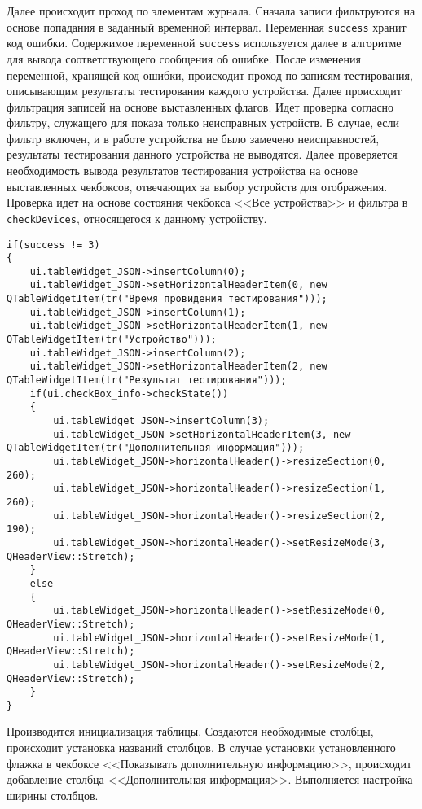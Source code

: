 Далее происходит проход по элементам журнала. Сначала записи фильтруются на основе попадания в заданный временной
интервал.
Переменная \texttt{success} хранит код ошибки. Содержимое переменной \texttt{success} используется далее в алгоритме для
вывода соответствующего сообщения об ошибке.
После изменения переменной, хранящей код ошибки, происходит проход по записям тестирования, описывающим результаты тестирования каждого устройства.
Далее происходит фильтрация записей на основе выставленных флагов. Идет проверка согласно фильтру, служащего для показа только
неисправных устройств. В случае, если фильтр включен, и в работе устройства не было замечено неисправностей, результаты
тестирования данного устройства не выводятся. Далее проверяется необходимость вывода результатов тестирования устройства
на основе выставленных чекбоксов, отвечающих за выбор устройств для отображения. Проверка идет на основе состояния
чекбокса <<Все устройства>> и фильтра в \texttt{checkDevices}, относящегося к данному устройству.
\medskip
\begin{verbatim}
if(success != 3)
{
	ui.tableWidget_JSON->insertColumn(0);
	ui.tableWidget_JSON->setHorizontalHeaderItem(0, new QTableWidgetItem(tr("Время провидения тестирования")));
	ui.tableWidget_JSON->insertColumn(1);
	ui.tableWidget_JSON->setHorizontalHeaderItem(1, new QTableWidgetItem(tr("Устройство")));
	ui.tableWidget_JSON->insertColumn(2);
	ui.tableWidget_JSON->setHorizontalHeaderItem(2, new QTableWidgetItem(tr("Результат тестирования")));
	if(ui.checkBox_info->checkState())
	{
		ui.tableWidget_JSON->insertColumn(3);
		ui.tableWidget_JSON->setHorizontalHeaderItem(3, new QTableWidgetItem(tr("Дополнительная информация")));
		ui.tableWidget_JSON->horizontalHeader()->resizeSection(0, 260);
		ui.tableWidget_JSON->horizontalHeader()->resizeSection(1, 260);
		ui.tableWidget_JSON->horizontalHeader()->resizeSection(2, 190);
		ui.tableWidget_JSON->horizontalHeader()->setResizeMode(3, QHeaderView::Stretch);
	}
	else
	{
		ui.tableWidget_JSON->horizontalHeader()->setResizeMode(0, QHeaderView::Stretch);
		ui.tableWidget_JSON->horizontalHeader()->setResizeMode(1, QHeaderView::Stretch);
		ui.tableWidget_JSON->horizontalHeader()->setResizeMode(2, QHeaderView::Stretch);
	}
}
\end{verbatim}
\medskip

Производится инициализация таблицы. Создаются необходимые столбцы, происходит установка названий столбцов. В случае
установки установленного флажка в чекбоксе <<Показывать дополнительную информацию>>, происходит добавление столбца
<<Дополнительная информация>>. Выполняется настройка ширины столбцов.

